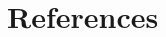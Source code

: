 \documentclass[a4paper]{jpconf}
\begin{document}


\section*{References}

\begin{thebibliography}{30}











\end{thebibliography}
\end{document}
